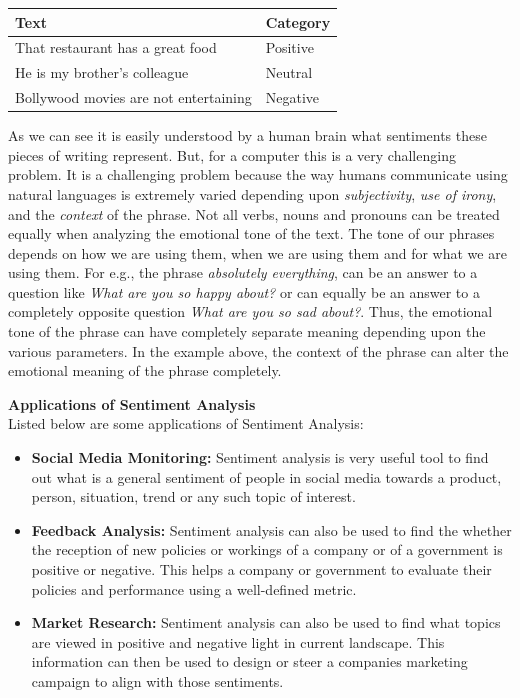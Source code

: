 \documentclass[a4paper, 12pt]{article}
\begin{document}
\begin{sloppypar}
\begin{table}[H]
\begin{tabularx}{\columnwidth}{| X | X |}
\hline
Text & Category \\ [0.5ex]
\hline
\hline
That restaurant has a great food & Positive \\ [0.5ex]
\hline
He is my brother's colleague & Neutral \\ [0.5ex]
\hline
Bollywood movies are not entertaining & Negative \\ [0.5ex]
\hline
\end{tabularx}
\end{table}

As we can see it is easily understood by a human brain what sentiments these pieces of writing represent. But, for a computer this is a very challenging problem. It is a challenging problem because the way humans communicate using natural languages is extremely varied depending  upon \textit{subjectivity}, \textit{use of irony}, and the \textit{context} of the phrase. Not all verbs, nouns and pronouns can be treated equally when analyzing the emotional tone of the text. The tone of our phrases depends on how we are using them, when we are using them and for what we are using them. For e.g., the phrase \textit{absolutely everything}, can be an answer to a question like \textit{What are you so happy about?} or can equally be an answer to a completely opposite  question \textit{What are you so sad about?}. Thus, the emotional tone of the phrase can have completely separate meaning depending upon the various parameters. In the example above, the context of the phrase can alter the emotional meaning of the phrase completely. 

\large \textbf{Applications of Sentiment Analysis} \\[0.5ex]
\normalsize
Listed below are some applications of Sentiment Analysis:
\begin{itemize}
\item{
\textbf{Social Media Monitoring: } Sentiment analysis is very useful tool to find out what is a general sentiment of people in social media towards a product, person, situation, trend or any such topic of interest.}
\item{
\textbf{Feedback Analysis: } Sentiment analysis can also be used to find the whether the  reception of new policies or workings of a company or of a government is positive or negative. This helps a company or government to evaluate their policies and performance using a well-defined metric.}
\item{
\textbf{Market Research: } Sentiment analysis can also be used to find what topics are viewed in positive and negative light in current landscape. This information can then be used to design or steer a companies marketing campaign to align with those sentiments.}
\end{itemize}



\end{sloppypar}
\end{document}
